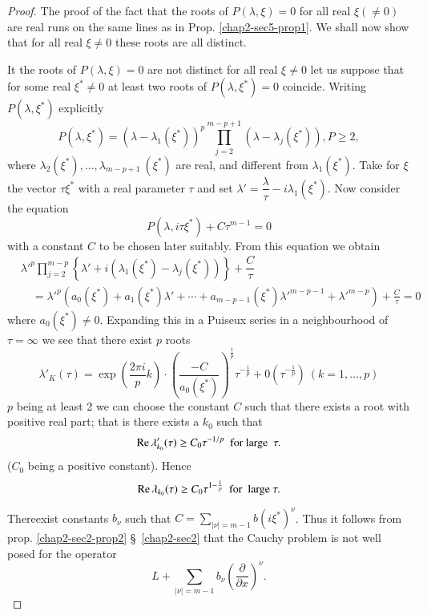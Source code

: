 \begin{proof}
The proof of the fact that the roots of $P(\lambda, \xi) = 0$ for all
real $\xi (\neq 0)$ are real runs on the same lines as in
Prop. \ref{chap2-sec5-prop1}. We shall 
now show that for all real $\xi \neq 0$ these roots are all distinct. 

It the roots of $P(\lambda, \xi ) = 0 $ are not distinct for all real
 $\xi \neq 0$ let us suppose that for some real $\xi^* \neq 0$ at
 least two roots of $P(\lambda,  \xi^*) = 0$\pageoriginale
 coincide. Writing  $P(\lambda,  \xi^*)$ explicitly 
 $$
 P(\lambda,  \xi^*) = (\lambda- \lambda_1 (\xi^*))^p
 \prod^{m-p+1}_{j=2}(\lambda- \lambda_j (\xi^*)),  P \geq 2,  
 $$
 where $\lambda_2(\xi^*), \ldots, \lambda_{m-p+1}~(\xi^*)$ are real,
 and different from $\lambda_1( \xi^*)$. Take for $\xi$ the vector
 $\tau \xi^*$ with a real parameter $\tau$ and set $\lambda'
 =\dfrac{\lambda}{\tau} - i \lambda_1 (\xi^*)$. Now consider the
 equation  
 $$
 P(\lambda,  i \tau \xi^*) + C \tau^{m-1} = 0 
 $$
 with a constant $C$ to be chosen later suitably. From this equation 
 we obtain 
\begin{align*}
& \lambda'^{p} \prod\limits^{m-p}_{j=2} \left\{ \lambda' + i (\lambda_1 
 (\xi^*) - \lambda_j (\xi^*))\right\}+ \dfrac{C}{\tau}\\
&\quad   = \lambda'^{p}(a_0 (\xi^*) + a_1 (\xi^*) \lambda' + \cdots
  +a_{m-p-1} (\xi^*) 
 \lambda'^{m-p-1} + \lambda'^{m-p}) + \frac{C}{\tau}=0 
\end{align*}
 where $a_0 (\xi^*) \neq 0$. Expanding this in a Puiseux series in a
 neighbourhood of $\tau = \infty $ we see that there exist $p$ roots 
$$
\lambda'_K (\tau) = \exp \left(\frac{2 \pi i}{p}k\right) \cdot 
\left(\frac{-C}{a_0
  (\xi^*)}\right)^{\frac{1}{p}} \tau^{- \frac{1}{p}} + 0
\left(\tau^{-\frac{1}{p}}\right)\ (k=1,  \ldots ,  p) 
$$ 
$p$ being at least 2 we can choose the constant $C$ such that there
exists a root with positive real part; that is there exists a $k_0$
such that  
 $$
 \operatorname{Re} \lambda'_{k_0}(\tau ) \geq C_0 \tau^{-1/p} \text{~ for large~ }
 \tau.  
 $$
 ($C_0$ being a positive constant). Hence
 $$
 \operatorname{Re} \lambda_{k_0} (\tau) \geq C_0 \tau^{1- \frac{1}{p}} \text{~ for~
   large } \tau. 
 $$

There\pageoriginale exist constants $b_\nu $ such that $C =
\sum\limits_{ | \nu | =  m-1} b (i  \xi^*)^\nu$. Thus it follows from
prop. \ref{chap2-sec2-prop2} \S\ \ref{chap2-sec2} that the 
Cauchy problem is not well posed for the operator 
$$
L + \sum\limits_{| \nu| = m-1} b_\nu\left(\frac{\partial}{\partial
  x}\right)^\nu. 
$$


\end{proof}
